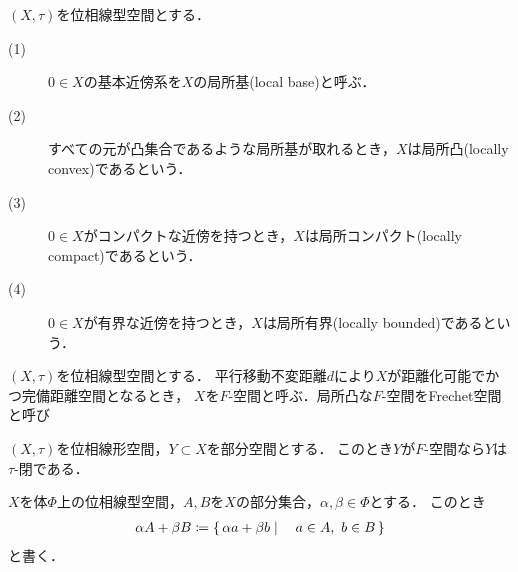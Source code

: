 	\begin{screen}
		\begin{thm}
		\end{thm}
	\end{screen}
	
	\begin{screen}
		\begin{dfn}
			$(X,\tau)$を位相線型空間とする．
			\begin{description}
				\item[(1)] $0 \in X$の基本近傍系を$X$の局所基(local base)と呼ぶ．
				\item[(2)] すべての元が凸集合であるような局所基が取れるとき，$X$は局所凸(locally convex)であるという．
				\item[(3)] $0 \in X$がコンパクトな近傍を持つとき，$X$は局所コンパクト(locally compact)であるという．
				\item[(4)] $0 \in X$が有界な近傍を持つとき，$X$は局所有界(locally bounded)であるという．
			\end{description}
		\end{dfn}
	\end{screen}
	
	\begin{screen}
		\begin{dfn}
			$(X,\tau)$を位相線型空間とする．
			平行移動不変距離$d$により$X$が距離化可能でかつ完備距離空間となるとき，
			$X$を$F$-空間と呼ぶ．局所凸な$F$-空間をFrechet空間と呼び
		\end{dfn}
	\end{screen}
	
	\begin{screen}
		\begin{thm}
			$(X,\tau)$を位相線形空間，$Y \subset X$を部分空間とする．
			このとき$Y$が$F$-空間なら$Y$は$\tau$-閉である．
		\end{thm}
	\end{screen}
	
	\begin{prf}
	\end{prf}
	
	\begin{screen}
		\begin{dfn}[集合の線型演算]
			$X$を体$\Phi$上の位相線型空間，$A,B$を$X$の部分集合，$\alpha,\beta \in \Phi$とする．
			このとき
			\begin{align}
				\alpha A + \beta B \coloneqq \left\{\, \alpha a + \beta b \mid \quad a \in A,\ b \in B\, \right\}
			\end{align}
			と書く．
		\end{dfn}
	\end{screen}
	
